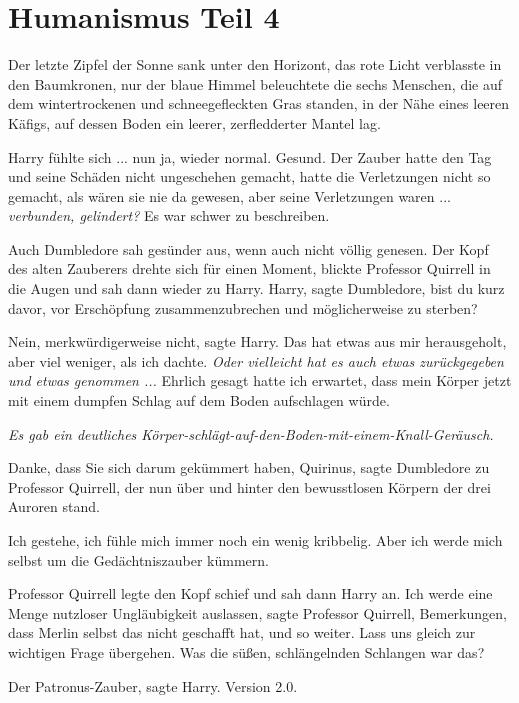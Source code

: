 \chapter{Humanismus Teil 4}

Der letzte Zipfel der Sonne sank unter den Horizont, das rote Licht verblasste
in den Baumkronen, nur der blaue Himmel beleuchtete die sechs Menschen, die auf
dem wintertrockenen und schneegefleckten Gras standen, in der Nähe eines leeren
Käfigs, auf dessen Boden ein leerer, zerfledderter Mantel lag.

Harry fühlte sich ... nun ja, wieder normal. Gesund. Der Zauber hatte den Tag und
seine Schäden nicht ungeschehen gemacht, hatte die Verletzungen nicht so
gemacht, als wären sie nie da gewesen, aber seine Verletzungen waren ...
\emph{verbunden, gelindert?} Es war schwer zu beschreiben.

Auch Dumbledore sah gesünder aus, wenn auch nicht völlig genesen. Der Kopf des
alten Zauberers drehte sich für einen Moment, blickte Professor Quirrell in die
Augen und sah dann wieder zu Harry. \glqq{}Harry\grqq{}, sagte Dumbledore, \glqq{}
bist du kurz davor, vor Erschöpfung zusammenzubrechen und möglicherweise zu
sterben?\grqq{}

\glqq{}Nein, merkwürdigerweise nicht\grqq{}, sagte Harry. \glqq{}Das hat etwas aus
mir herausgeholt, aber viel weniger, als ich dachte.\grqq{}
\emph{Oder vielleicht hat es auch etwas zurückgegeben und etwas genommen ...}
\glqq{}Ehrlich gesagt hatte ich erwartet, dass mein Körper jetzt mit einem
dumpfen Schlag auf dem Boden aufschlagen würde.\grqq{}

\emph{Es gab ein deutliches
Körper-schlägt-auf-den-Boden-mit-einem-Knall-Geräusch.}

\glqq{}Danke, dass Sie sich darum gekümmert haben, Quirinus\grqq{}, sagte
Dumbledore zu Professor Quirrell, der nun über und hinter den bewusstlosen
Körpern der drei Auroren stand.

\glqq{}Ich gestehe, ich fühle mich immer noch ein wenig kribbelig. Aber ich werde
mich selbst um die Gedächtniszauber kümmern.\grqq{}

Professor Quirrell legte den Kopf schief und sah dann Harry an. \glqq{}Ich werde
eine Menge nutzloser Ungläubigkeit auslassen\grqq{}, sagte Professor Quirrell,
\glqq{}Bemerkungen, dass Merlin selbst das nicht geschafft hat, und so weiter.
Lass uns gleich zur wichtigen Frage übergehen. Was die süßen, schlängelnden
Schlangen war das?\grqq{}

\glqq{}Der Patronus-Zauber\grqq{}, sagte Harry. \glqq{}Version 2.0.\grqq{}

